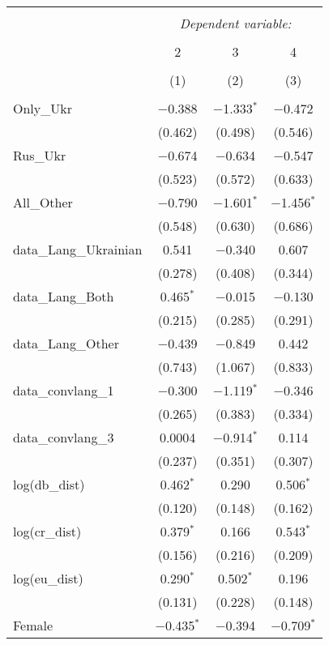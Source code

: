 
\begin{table}[!htbp] \centering 
  \caption{} 
  \label{} 
\tiny 
\begin{tabular}{@{\extracolsep{1pt}}lccc} 
\\[-1.8ex]\hline 
\hline \\[-1.8ex] 
 & \multicolumn{3}{c}{\textit{Dependent variable:}} \\ 
\cline{2-4} 
\\[-1.8ex] & 2 & 3 & 4 \\ 
\\[-1.8ex] & (1) & (2) & (3)\\ 
\hline \\[-1.8ex] 
 Only\_Ukr & $-$0.388 & $-$1.333$^{*}$ & $-$0.472 \\ 
  & (0.462) & (0.498) & (0.546) \\ 
  Rus\_Ukr & $-$0.674 & $-$0.634 & $-$0.547 \\ 
  & (0.523) & (0.572) & (0.633) \\ 
  All\_Other & $-$0.790 & $-$1.601$^{*}$ & $-$1.456$^{*}$ \\ 
  & (0.548) & (0.630) & (0.686) \\ 
  data\_Lang\_Ukrainian & 0.541 & $-$0.340 & 0.607 \\ 
  & (0.278) & (0.408) & (0.344) \\ 
  data\_Lang\_Both & 0.465$^{*}$ & $-$0.015 & $-$0.130 \\ 
  & (0.215) & (0.285) & (0.291) \\ 
  data\_Lang\_Other & $-$0.439 & $-$0.849 & 0.442 \\ 
  & (0.743) & (1.067) & (0.833) \\ 
  data\_convlang\_1 & $-$0.300 & $-$1.119$^{*}$ & $-$0.346 \\ 
  & (0.265) & (0.383) & (0.334) \\ 
  data\_convlang\_3 & 0.0004 & $-$0.914$^{*}$ & 0.114 \\ 
  & (0.237) & (0.351) & (0.307) \\ 
  log(db\_dist) & 0.462$^{*}$ & 0.290 & 0.506$^{*}$ \\ 
  & (0.120) & (0.148) & (0.162) \\ 
  log(cr\_dist) & 0.379$^{*}$ & 0.166 & 0.543$^{*}$ \\ 
  & (0.156) & (0.216) & (0.209) \\ 
  log(eu\_dist) & 0.290$^{*}$ & 0.502$^{*}$ & 0.196 \\ 
  & (0.131) & (0.228) & (0.148) \\ 
  Female & $-$0.435$^{*}$ & $-$0.394 & $-$0.709$^{*}$ \\ 

\end{tabular}
\end{table}
